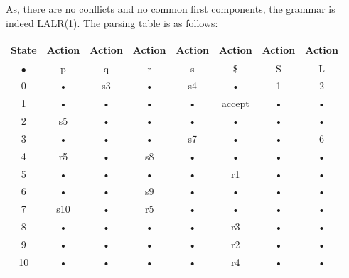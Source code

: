 \documentclass[10pt]{letter}
\begin{document}
\begin{enumerate}
As, there are no conflicts and no common first components, the grammar is indeed LALR(1). The parsing table is as follows:\\
\begin{tabular}{|c|c|c|c|c|c|c|c|}
\hline 
State & Action & Action & Action & Action & Action & Action & Action \\ 
\hline 
$•$ & p & q & r & s & \$ & S & L \\ 
\hline 
0 & • & s3 & • & s4 & • & 1 & 2 \\ 
\hline 
1 & • & • & • & • & accept & • & • \\ 
\hline 
2 & s5 & • & • & • & • & • & • \\ 
\hline 
3 & • & • & • & s7 & • & • & 6 \\ 
\hline 
4 & r5 & • & s8 & • & • & • & • \\ 
\hline 
5 & • & • & • & • & r1 & • & • \\ 
\hline 
6 & • & • & s9 & • & • & • & • \\ 
\hline 
7 & s10 & • & r5 & • & • & • & • \\ 
\hline 
8 & • & • & • & • & r3 & • & • \\ 
\hline 
9 & • & • & • & • & r2 & • & • \\ 
\hline 
10 & • & • & • & • & r4 & • & • \\ 
\hline 
\end{tabular} 


\end{enumerate}
\end{document}

